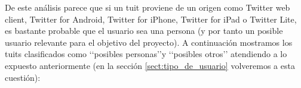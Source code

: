 De este análisis parece que si un tuit proviene de un origen como Twitter web client,
Twitter for Android, Twitter for iPhone, Twitter for iPad o Twitter Lite,
es bastante probable que el usuario sea una persona (y por tanto un posible
usuario relevante para el objetivo del proyecto). A continuación mostramos
los tuits clasificados como \lq\lq posibles personas\rq\rq y \lq\lq posibles otros\rq\rq
atendiendo a lo expuesto anteriormente (en la sección \ref{sect:tipo_de_usuario} volveremos
a esta cuestión):

